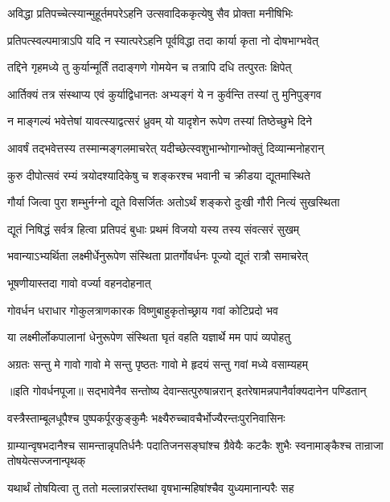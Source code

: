 \twolineshloka
{अविद्धा प्रतिपच्चेत्स्यान्मुहूर्तमपरेऽहनि}
{उत्सवादिककृत्येषु सैव प्रोक्ता मनीषिभिः} %

\twolineshloka
{प्रतिपत्स्वल्पमात्राऽपि यदि न स्यात्परेऽहनि}
{पूर्वविद्धा तदा कार्या कृता नो दोषभाग्भवेत्} %

\twolineshloka
{तद्दिने गृहमध्ये तु कुर्यान्मूर्तिं तदाङ्गणे}
{गोमयेन च तत्रापि दधि तत्पुरतः क्षिपेत्} %

\twolineshloka
{आर्तिक्यं तत्र संस्थाप्य एवं कुर्याद्विधानतः}
{अभ्यङ्गं ये न कुर्वन्ति तस्यां तु मुनिपुङ्गव} %

\twolineshloka
{न माङ्गल्यं भवेत्तेषां यावत्स्याद्वत्सरं ध्रुवम्}
{यो यादृशेन रूपेण तस्यां तिष्ठेच्छुभे दिने} %

\twolineshloka
{आवर्षं तद्भवेत्तस्य तस्मान्मङ्गलमाचरेत्}
{यदीच्छेत्स्वशुभान्भोगान्भोक्तुं दिव्यान्मनोहरान्} %

\twolineshloka
{कुरु दीपोत्सवं रम्यं त्रयोदश्यादिकेषु च}
{शङ्करश्च भवानी च क्रीडया द्यूतमास्थिते} %

\twolineshloka
{गौर्या जित्वा पुरा शम्भुर्नग्नो द्यूते विसर्जितः}
{अतोऽर्थं शङ्करो दुःखी गौरी नित्यं सुखस्थिता} %

\twolineshloka
{द्यूतं निषिद्धं सर्वत्र हित्वा प्रतिपदं बुधाः}
{प्रथमं विजयो यस्य तस्य संवत्सरं सुखम्} %

\twolineshloka
{भवान्याऽभ्यर्थिता लक्ष्मीर्धेनुरूपेण संस्थिता}
{प्रातर्गोवर्धनः पूज्यो द्यूतं रात्रौ समाचरेत्} %


\onelineshloka
{भूषणीयास्तदा गावो वर्ज्या वहनदोहनात्} %

\twolineshloka
{गोवर्धन धराधार गोकुलत्राणकारक}
{विष्णुबाहुकृतोच्छ्राय गवां कोटिप्रदो भव} %

\twolineshloka
{या लक्ष्मीर्लोकपालानां धेनुरूपेण संस्थिता}
{घृतं वहति यज्ञार्थे मम पापं व्यपोहतु} %

\twolineshloka
{अग्रतः सन्तु मे गावो गावो मे सन्तु पृष्ठतः}
{गावो मे हृदयं सन्तु गवां मध्ये वसाम्यहम्} %


॥इति गोवर्धनपूजा॥
\twolineshloka
{सद्भावेनैव सन्तोष्य देवान्सत्पुरुषान्नरान्}
{इतरेषामन्नपानैर्वाक्यदानेन पण्डितान्} %

\twolineshloka
{वस्त्रैस्ताम्बूलधूपैश्च पुष्पकर्पूरकुङ्कुमैः}
{भक्ष्यैरुच्चावचैर्भोज्यैरन्तःपुरनिवासिनः} %

\threelineshloka
{ग्राम्यान्वृषभदानैश्च सामन्तान्नृपतिर्धनैः}
{पदातिजनसङ्घांश्च ग्रैवेयैः कटकैः शुभैः}
{स्वनामाङ्कैश्च तान्राजा तोषयेत्सज्जनान्पृथक्} %

\twolineshloka
{यथार्थं तोषयित्वा तु ततो मल्लान्नरांस्तथा}
{वृषभान्महिषांश्चैव युध्यमानान्परैः सह} %

